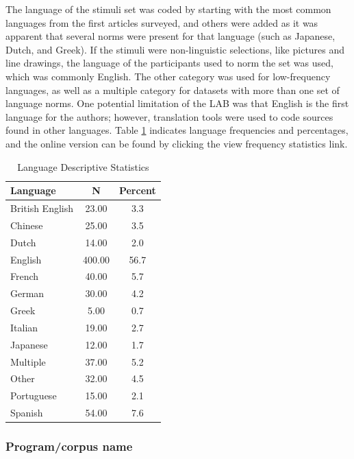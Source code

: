 \documentclass[english,man]{apa6}
\theoremstyle{definition}
\theoremstyle{definition}
\theoremstyle{definition}
\theoremstyle{remark}
\begin{document}
The language of the stimuli set was coded by starting with the most
common languages from the first articles surveyed, and others were added
as it was apparent that several norms were present for that language
(such as Japanese, Dutch, and Greek). If the stimuli were non-linguistic
selections, like pictures and line drawings, the language of the
participants used to norm the set was used, which was commonly English.
The other category was used for low-frequency languages, as well as a
multiple category for datasets with more than one set of language norms.
One potential limitation of the LAB was that English is the first
language for the authors; however, translation tools were used to code
sources found in other languages. Table \ref{tab:lang-table} indicates
language frequencies and percentages, and the online version can be
found by clicking the view frequency statistics link.

\begin{table}[tbp]
\begin{center}
\begin{threeparttable}
\caption{\label{tab:lang-table}Language Descriptive Statistics}
\begin{tabular}{lcc}
\toprule
Language & \multicolumn{1}{c}{N} & \multicolumn{1}{c}{Percent}\\
\midrule
British English & 23.00 & 3.3\\
Chinese & 25.00 & 3.5\\
Dutch & 14.00 & 2.0\\
English & 400.00 & 56.7\\
French & 40.00 & 5.7\\
German & 30.00 & 4.2\\
Greek & 5.00 & 0.7\\
Italian & 19.00 & 2.7\\
Japanese & 12.00 & 1.7\\
Multiple & 37.00 & 5.2\\
Other & 32.00 & 4.5\\
Portuguese & 15.00 & 2.1\\
Spanish & 54.00 & 7.6\\
\bottomrule
\end{tabular}
\end{threeparttable}
\end{center}
\end{table}

\subsubsection{Program/corpus name}\label{programcorpus-name}
\end{document}
